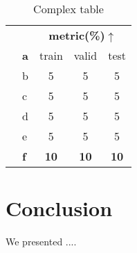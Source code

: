         \begin{table}[htbp]
        \begin{center}
        
        \begin{tabular}{|c|l|c|c|c|}
        \cline{3-5}
        \multicolumn{2}{c|}{}&\multicolumn{3}{|c|}{\textbf{metric(\%)$\uparrow$}}\\
        \cline{2-5}
        \multicolumn{1}{c|}{}&\textbf{a} & train & valid & test  \\
        \hline
        
        \parbox[t]{2mm}{}
        & b      &   5   &   5  &   5  \\
        & c      &   5   &   5  &   5  \\
        \hline
        \hline
        
        \parbox[t]{2mm}{} 
        & d      &   5  &   5   &   5  \\
        & e            &   5   &   5   &   5  \\
        \hline
        \hline   

        &\textbf{f} &   \textbf{10}   &   \textbf{10}   &   \textbf{10} \\
        \hline
        
        \end{tabular}
        \caption{Complex table}
        \label{tab:complex}
        \end{center}
        \end{table}


        
\section*{Conclusion}
    We presented ....